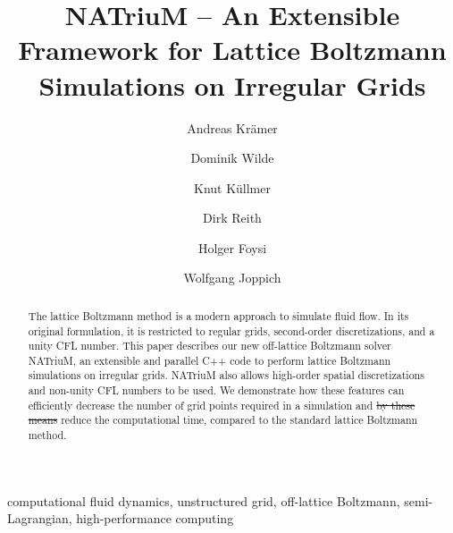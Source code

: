 \documentclass[1p, sort&compress]{elsarticle}
\providecommand{\DIFaddtex}[1]{{\protect\color{blue}\uwave{#1}}} %
\providecommand{\DIFdeltex}[1]{{\protect\color{red}\sout{#1}}}                      %
\providecommand{\DIFaddbegin}{} %
\providecommand{\DIFaddend}{} %
\providecommand{\DIFdelbegin}{} %
\providecommand{\DIFdelend}{} %
\providecommand{\DIFadd}[1]{\texorpdfstring{\DIFaddtex{#1}}{#1}} %
\providecommand{\DIFdel}[1]{\texorpdfstring{\DIFdeltex{#1}}{}} %
\newcommand{\DIFscaledelfig}{0.5}
\newlength{\DIFdelgraphicswidth} %
\newlength{\DIFdelgraphicsheight} %
\newcommand{\DIFaddincludegraphics}[2][]{{\color{blue}\fbox{\DIFOincludegraphics[#1]{#2}}}} %
\newcommand{\DIFdelincludegraphics}[2][]{%
\sbox{\DIFdelgraphicsbox}{\DIFOincludegraphics[#1]{#2}}%
\settoboxwidth{\DIFdelgraphicswidth}{\DIFdelgraphicsbox} %
\settoboxtotalheight{\DIFdelgraphicsheight}{\DIFdelgraphicsbox} %
\scalebox{\DIFscaledelfig}{%
\parbox[b]{\DIFdelgraphicswidth}{\usebox{\DIFdelgraphicsbox}\\[-\baselineskip] \rule{\DIFdelgraphicswidth}{0em}}\llap{\resizebox{\DIFdelgraphicswidth}{\DIFdelgraphicsheight}{%
\setlength{\unitlength}{\DIFdelgraphicswidth}%
\begin{picture}(1,1)%
\thicklines\linethickness{2pt} %
{\color[rgb]{1,0,0}\put(0,0){\framebox(1,1){}}}%
{\color[rgb]{1,0,0}\put(0,0){\line( 1,1){1}}}%
{\color[rgb]{1,0,0}\put(0,1){\line(1,-1){1}}}%
\end{picture}%
}\hspace*{3pt}}} %
} %
\DeclareRobustCommand{\DIFaddbegin}{\DIFOaddbegin \let\includegraphics\DIFaddincludegraphics} %
\DeclareRobustCommand{\DIFaddend}{\DIFOaddend \let\includegraphics\DIFOincludegraphics} %
\DeclareRobustCommand{\DIFdelbegin}{\DIFOdelbegin \let\includegraphics\DIFdelincludegraphics} %
\DeclareRobustCommand{\DIFdelend}{\DIFOaddend \let\includegraphics\DIFOincludegraphics} %
\begin{document}

\begin{frontmatter}

\title{NATriuM -- An Extensible Framework for Lattice Boltzmann Simulations on Irregular Grids}

\author[hbrs]{Andreas Kr\"amer}
\author[hbrs]{Dominik Wilde}
\author[hbrs]{Knut K\"ullmer}
\author[hbrs]{Dirk Reith}
\author[siegen]{Holger Foysi}
\author[hbrs]{Wolfgang Joppich}

\address[hbrs]{
Institute for Technology, Renewables and Energy-efficient Engineering, Bonn-Rhein-Sieg University of Applied Sciences, Grantham-Allee 20, 53757 Sankt Augustin, Germany}
\address[siegen]{Department of Mechanical Engineering, University of Siegen,  Paul-Bonatz-Stra{\ss}e 9-11, 57076 Siegen-Weidenau, Germany}


\begin{abstract}
The lattice Boltzmann method is a modern approach to simulate fluid flow. In its original formulation, it is restricted to regular grids, second-order discretizations, and a unity CFL number. This paper describes our new off-lattice Boltzmann solver NATriuM, an extensible and parallel C++ code to perform lattice Boltzmann simulations on irregular grids. NATriuM also allows high-order spatial discretizations and non-unity CFL numbers to be used. We demonstrate how these features can efficiently decrease the number of grid points required in a simulation and \DIFdelbegin \DIFdel{by these means }\DIFdelend \DIFaddbegin \DIFadd{thus }\DIFaddend reduce the computational time, compared to the standard lattice Boltzmann method. 

\end{abstract}

\begin{keyword}
computational fluid dynamics, unstructured grid, off-lattice Boltzmann, semi-Lagrangian, high-performance computing
\end{keyword}

\end{frontmatter}
\end{document}
